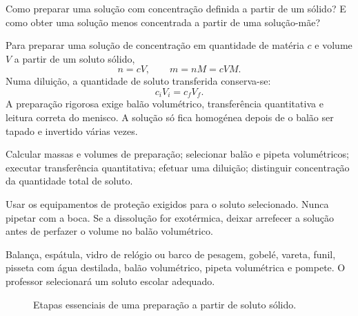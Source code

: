 \documentclass[11pt,a4paper,openany]{book}
\begin{document}
\begin{questao}
Como preparar uma solução com concentração definida a partir de um sólido? E como obter uma solução menos concentrada a partir de uma solução-mãe?
\end{questao}

\begin{fundamento}
Para preparar uma solução de concentração em quantidade de matéria $c$ e volume $V$ a partir de um soluto sólido,
\[
 n=cV,\qquad m=nM=cVM.
\]
Numa diluição, a quantidade de soluto transferida conserva-se:
\[
 c_iV_i=c_fV_f.
\]
A preparação rigorosa exige balão volumétrico, transferência quantitativa e leitura correta do menisco. A solução só fica homogénea depois de o balão ser tapado e invertido várias vezes.
\end{fundamento}

\begin{objetivos}
Calcular massas e volumes de preparação; selecionar balão e pipeta volumétricos; executar transferência quantitativa; efetuar uma diluição; distinguir concentração da quantidade total de soluto.
\end{objetivos}

\begin{seguranca}
Usar os equipamentos de proteção exigidos para o soluto selecionado. Nunca pipetar com a boca. Se a dissolução for exotérmica, deixar arrefecer a solução antes de perfazer o volume no balão volumétrico.
\end{seguranca}

\begin{material}
Balança, espátula, vidro de relógio ou barco de pesagem, gobelé, vareta, funil, pisseta com água destilada, balão volumétrico, pipeta volumétrica e pompete. O professor selecionará um soluto escolar adequado.
\end{material}

\begin{figure}[H]
\centering
{}
\caption{Etapas essenciais de uma preparação a partir de soluto sólido.}
\end{figure}
\end{document}
